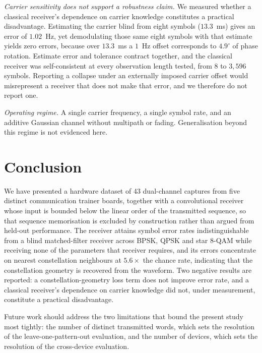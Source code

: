 \documentclass[journal]{IEEEtran}   %
\begin{document}
\emph{Carrier sensitivity does not support a robustness claim.} We measured
whether a classical receiver's dependence on carrier knowledge constitutes a
practical disadvantage. Estimating the carrier blind from eight symbols
($13.3$~ms) gives an error of $1.02$~Hz, yet demodulating those same eight
symbols with that estimate yields zero errors, because over $13.3$~ms a $1$~Hz
offset corresponds to $4.9^{\circ}$ of phase rotation. Estimate error and
tolerance contract together, and the classical receiver was self-consistent at
every observation length tested, from 8 to $3{,}596$ symbols. Reporting a
collapse under an externally imposed carrier offset would misrepresent a
receiver that does not make that error, and we therefore do not report one.

\emph{Operating regime.} A single carrier frequency, a single symbol rate, and
an additive Gaussian channel without multipath or fading. Generalisation beyond
this regime is not evidenced here.

\section{Conclusion}
We have presented a hardware dataset of 43 dual-channel captures from five
distinct communication trainer boards, together with a convolutional receiver
whose input is bounded below the linear order of the transmitted sequence, so
that sequence memorisation is excluded by construction rather than argued from
held-out performance. The receiver attains symbol error rates indistinguishable
from a blind matched-filter receiver across BPSK, QPSK and star 8-QAM while
receiving none of the parameters that receiver requires, and its errors
concentrate on nearest constellation neighbours at $5.6\times$ the chance rate,
indicating that the constellation geometry is recovered from the waveform. Two
negative results are reported: a constellation-geometry loss term does not
improve error rate, and a classical receiver's dependence on carrier knowledge
did not, under measurement, constitute a practical disadvantage.

Future work should address the two limitations that bound the present study
most tightly: the number of distinct transmitted words, which sets the
resolution of the leave-one-pattern-out evaluation, and the number of devices,
which sets the resolution of the cross-device evaluation.

\end{document}
